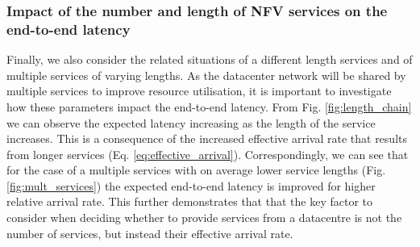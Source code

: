 \subsubsection{Impact of the number and length of NFV services on the end-to-end latency}
Finally, we also consider the related situations of a different length services and of multiple services of varying lengths. As the datacenter network will be shared by multiple services to improve resource utilisation, it is important to investigate how these parameters impact the end-to-end latency. From Fig. \ref{fig:length_chain} we can observe the expected latency increasing as the length of the service increases. This is a consequence of the increased effective arrival rate that results from longer services (Eq. \ref{eq:effective_arrival}). Correspondingly, we can see that for the case of a multiple services with on average lower service lengths (Fig. \ref{fig:mult_services}) the expected end-to-end latency is improved for higher relative arrival rate. This further demonstrates that that the key factor to consider when deciding whether to provide services from a datacentre is not the number of services, but instead their effective arrival rate.